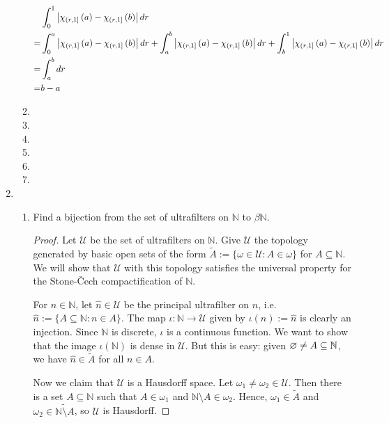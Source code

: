 \documentclass[a4paper,10pt]{report}
\newcommand{\N}{\mathbb{N}}
\begin{document}
\begin{enumerate}
\begin{enumerate}
                  \begin{align*}
                    &\int_0^1 \left| \chi_{\left( r , 1 \right]} \left( a \right) - \chi_{\left( r , 1 \right]} \left( b \right) \right| dr\\
                    =& \int_0^a \left| \chi_{\left( r , 1 \right]} \left( a \right) - \chi_{\left( r , 1 \right]} \left( b \right) \right| dr + \int_a^b \left| \chi_{\left( r , 1 \right]} \left( a \right) - \chi_{\left( r , 1 \right]} \left( b \right) \right| dr + \int_b^1 \left| \chi_{\left( r , 1 \right]} \left( a \right) - \chi_{\left( r , 1 \right]} \left( b \right) \right| dr\\
                    =& \int_a^b dr\\
                    =& b - a
                  \end{align*}
			\item 
			\item 
			\item 
			\item 
			\item 
			\item 
		\end{enumerate}
	\item
		\begin{enumerate}
			\item Find a bijection from the set of ultrafilters on $\N$ to $\beta\N$.
				\begin{proof}
					Let $\mathscr{U}$ be the set of ultrafilters on $\N$.
					Give $\mathscr{U}$ the topology generated by basic open sets of the form
					$\widetilde{A} := \{\omega \in \mathscr{U} : A \in \omega\}$ for $A \subseteq \N$.
					We will show that $\mathscr{U}$ with this topology satisfies the universal
					property for the Stone-\v{C}ech compactification of $\N$.
					
					For $n \in \N$, let $\widehat{n} \in \mathscr{U}$ be the principal ultrafilter
					on $n$, i.e. $\widehat{n} := \{A \subseteq \N : n \in A\}$.
					The map $\iota : \N \to \mathscr{U}$ given by $\iota(n) := \widehat{n}$
					is clearly an injection.
					Since $\N$ is discrete, $\iota$ is a continuous function.
					We want to show that the image $\iota(\N)$ is dense in $\mathscr{U}$.
					But this is easy: given $\es \ne A \subseteq \N$,
					we have $\widehat{n} \in \widetilde{A}$ for all $n \in A$.
					
					Now we claim that $\mathscr{U}$ is a Hausdorff space.
					Let $\omega_1 \ne \omega_2 \in \mathscr{U}$.
					Then there is a set $A \subseteq \N$ such that $A \in \omega_1$
					and $\N \setminus A \in \omega_2$.
					Hence, $\omega_1 \in \widetilde{A}$
					and $\omega_2 \in \widetilde{\N \setminus A}$, so $\mathscr{U}$ is Hausdorff.
					

\end{proof}
\end{enumerate}
\end{enumerate}
\end{document}
